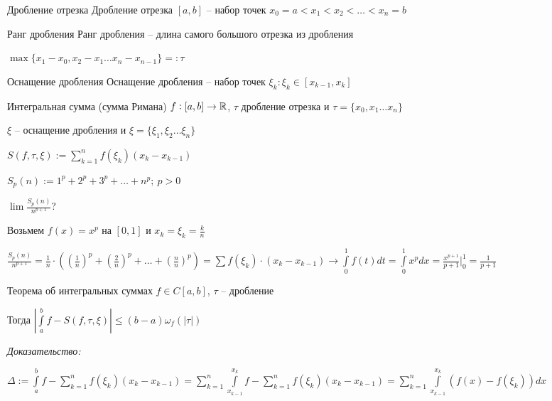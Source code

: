 \documentclass[12pt]{article}
\begin{document}
\begin{defin}{Дробление отрезка}
    Дробление отрезка $[a, b]$ -- набор точек $x_0 = a < x_1 < x_2 < \ldots < x_n = b$
\end{defin}

\begin{defin}{Ранг дробления}
    Ранг дробления -- длина самого большого отрезка из дробления

    $\max\{x_1 - x_0, x_2 - x_1 \ldots x_n - x_{n - 1}\} =: \tau$
\end{defin}

\begin{defin}{Оснащение дробления}
    Оснащение дробления -- набор точек $\xi_k : \xi_k \in [x_{k - 1}, x_k]$
\end{defin}

\begin{defin}{Интегральная сумма (сумма Римана)}
    $f : [a, b] \to \mathbb R$, $\tau$ дробление отрезка и $\tau = \{ x_0, x_1 \ldots x_n \}$

    $\xi$ -- оснащение дробления и $\xi = \{ \xi_1, \xi_2 \ldots \xi_n \}$

    $S(f, \tau, \xi) := \sum\limits_{k = 1}^n f(\xi_k)(x_k - x_{k - 1})$
\end{defin}

\begin{Example}{}
    $S_p(n) := 1^p + 2^p + 3^p + \ldots + n^p;\ p > 0$

    $\lim \frac{S_p(n)}{n^{p + 1}}$?

    Возьмем $f(x) = x^p$ на $[0, 1]$ и $x_k = \xi_k = \frac{k}{n}$

    $\frac{S_p(n)}{n^{p + 1}} = \frac{1}{n} \cdot ((\frac{1}{n})^p + (\frac{2}{n})^p + \ldots + (\frac{n}{n})^p) = \sum f(\xi_k) \cdot (x_k - x_{k - 1}) \rightarrow \int\limits_0^1 f(t)dt = \int\limits_0^1 x^pdx = \frac{x^{p+1}}{p + 1}|_0^1 = \frac{1}{p + 1}$
\end{Example}

\begin{theo}{Теорема об интегральных суммах}
    $f \in C[a, b]$, $\tau$ -- дробление

    Тогда $|\int\limits_a^b f - S(f, \tau, \xi)| \leq (b - a)\omega_f(|\tau|)$
\end{theo}

\textit{Доказательство:}

$\Delta := \int\limits_a^b f - \sum\limits_{k = 1}^n f(\xi_k)(x_k - x_{k - 1}) = \sum\limits_{k = 1}^n \int\limits_{x_{k - 1}}^{x_k} f - \sum\limits_{k = 1}^n f(\xi_k)(x_k - x_{k - 1}) = \sum\limits_{k = 1}^n \int\limits_{x_{k - 1}}^{x_k} (f(x) - f(\xi_k))dx$
\end{document}
